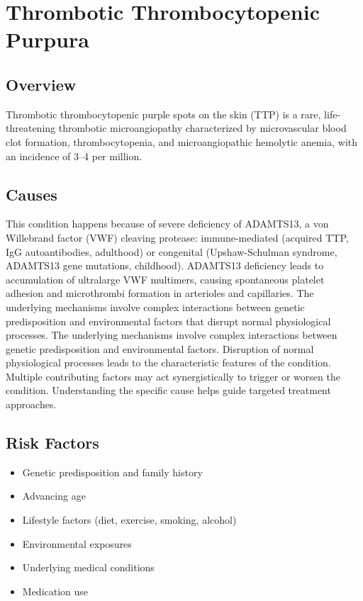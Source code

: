 \chapter{Thrombotic Thrombocytopenic Purpura}
\label{sec:Thrombotic Thrombocytopenic Purpura}

\section{Overview}
Thrombotic thrombocytopenic purple spots on the skin (TTP) is a rare, life-threatening thrombotic microangiopathy characterized by microvascular blood clot formation, thrombocytopenia, and microangiopathic hemolytic anemia, with an incidence of 3--4 per million.
\section{Causes}
This condition happens because of severe deficiency of ADAMTS13, a von Willebrand factor (VWF) cleaving protease: immune-mediated (acquired TTP, IgG autoantibodies, adulthood) or congenital (Upshaw-Schulman syndrome, ADAMTS13 gene mutations, childhood). ADAMTS13 deficiency leads to accumulation of ultralarge VWF multimers, causing spontaneous platelet adhesion and microthrombi formation in arterioles and capillaries. The underlying mechanisms involve complex interactions between genetic predisposition and environmental factors that disrupt normal physiological processes. The underlying mechanisms involve complex interactions between genetic predisposition and environmental factors. Disruption of normal physiological processes leads to the characteristic features of the condition. Multiple contributing factors may act synergistically to trigger or worsen the condition. Understanding the specific cause helps guide targeted treatment approaches.
\section{Risk Factors}


\begin{itemize}[noitemsep]
  \item Genetic predisposition and family history
  \item Advancing age
  \item Lifestyle factors (diet, exercise, smoking, alcohol)
  \item Environmental exposures
  \item Underlying medical conditions
  \item Medication use
\end{itemize}

